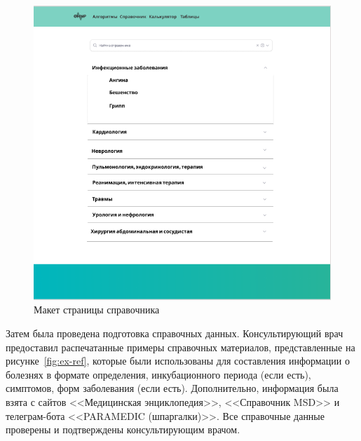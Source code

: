 \begin{figure}
  \includegraphics[scale=0.5]{styles/diploma/inc/Макет.png}
  \caption{Макет страницы справочника}
  \label{fig:page-model}
\end{figure}

Затем была проведена подготовка справочных данных. Консультирующий врач предоставил распечатанные примеры справочных материалов, представленные на рисунке~\ref{fig:ex-ref}, которые были использованы для составления информации о болезнях в формате определения, инкубационного периода (если есть), симптомов, форм заболевания (если есть). Дополнительно, информация была взята с сайтов <<Медицинская энциклопедия>>\cite{Encyclopedia}, <<Справочник MSD>>\cite{MSD} и телеграм-бота <<PARAMEDIC (шпаргалки)>>\cite{Paramedic}. Все справочные данные проверены и подтверждены консультирующим врачом.

